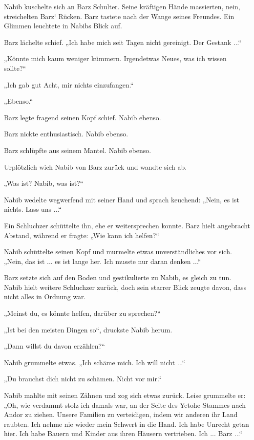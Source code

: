 Nabib kuschelte sich an Barz Schulter. Seine kräftigen Hände massierten, nein, streichelten Barz‘ Rücken. Barz tastete nach der Wange seines Freundes. Ein Glimmen leuchtete in Nabibs Blick auf.

Barz lächelte schief. „Ich habe mich seit Tagen nicht gereinigt. Der Gestank ...“

„Könnte mich kaum weniger kümmern. Irgendetwas Neues, was ich wissen sollte?“

„Ich gab gut Acht, mir nichts einzufangen.“

„Ebenso.“

Barz legte fragend seinen Kopf schief. Nabib ebenso.

Barz nickte enthusiastisch. Nabib ebenso.

Barz schlüpfte aus seinem Mantel. Nabib ebenso.\bigskip







Urplötzlich wich Nabib von Barz zurück und wandte sich ab.

„Was ist? Nabib, was ist?“

Nabib wedelte wegwerfend mit seiner Hand und sprach keuchend: „Nein, es ist nichts. Lass uns ...“

Ein Schluchzer schüttelte ihn, ehe er weitersprechen konnte. Barz hielt angebracht Abstand, während er fragte: „Wie kann ich helfen?“

Nabib schüttelte seinen Kopf und murmelte etwas unverständliches vor sich. „Nein, das ist ... es ist lange her. Ich musste nur daran denken ...“

Barz setzte sich auf den Boden und gestikulierte zu Nabib, es gleich zu tun. Nabib hielt weitere Schluchzer zurück, doch sein starrer Blick zeugte davon, dass nicht alles in Ordnung war.

„Meinst du, es könnte helfen, darüber zu sprechen?“

„Ist bei den meisten Dingen so“, druckste Nabib herum.

„Dann willst du davon erzählen?“

Nabib grummelte etwas. „Ich schäme mich. Ich will nicht ...“

„Du brauchst dich nicht zu schämen. Nicht vor mir.“

Nabib mahlte mit seinen Zähnen und zog sich etwas zurück. Leise grummelte er: „Oh, wie verdammt stolz ich damals war, an der Seite des Yetohe-Stammes nach Andor zu ziehen. Unsere Familien zu verteidigen, indem wir anderen ihr Land raubten. Ich nehme nie wieder mein Schwert in die Hand. Ich habe Unrecht getan hier. Ich habe Bauern und Kinder aus ihren Häusern vertrieben. Ich ... Barz ...“

